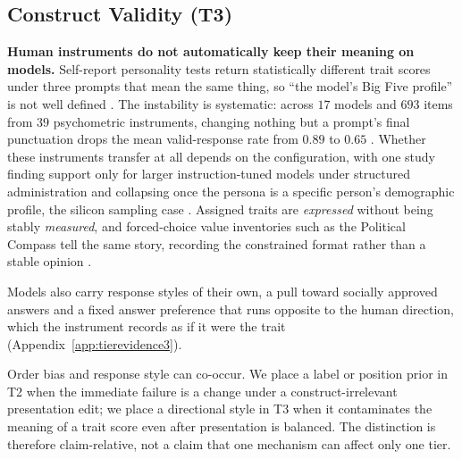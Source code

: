 \documentclass[11pt]{article}
\begin{document}
\subsection{Construct Validity (T3)}
\label{sec:t3}

\textbf{Human instruments do not automatically keep their meaning on models.} Self-report
personality tests return statistically different trait scores under three prompts
that mean the same thing, so ``the model's Big Five profile'' is not well defined
\cite{gupta2024self}. The instability is systematic: across $17$ models and $693$
items from $39$ psychometric instruments, changing nothing but a prompt's final
punctuation drops the mean valid-response rate from $0.89$ to $0.65$
\cite{shu2024dont}. Whether these instruments transfer at all depends on the
configuration, with one study finding support only for larger instruction-tuned models under structured
administration \cite{serapiogarcia2023personality} and collapsing once the
persona is a specific person's demographic profile, the silicon sampling case
\cite{petrov2024limited}. Assigned traits are \emph{expressed}
\cite{jiang2024personallm} without being stably \emph{measured}, and
forced-choice value inventories such as the Political Compass tell the same
story, recording the constrained format rather than a stable opinion
\cite{rottger2024political}.

Models also carry response styles of their own, a pull toward socially
approved answers and a fixed answer preference that runs opposite to the
human direction, which the instrument records as if it were the trait
\cite{salecha2024social,braun2025acquiescence} (Appendix~\ref{app:tierevidence3}).

Order bias and response style can co-occur. We place a label or position prior
in T2 when the immediate failure is a change under a construct-irrelevant
presentation edit; we place a directional style in T3 when it contaminates the
meaning of a trait score even after presentation is balanced. The distinction is
therefore claim-relative, not a claim that one mechanism can affect only one tier.
\end{document}
